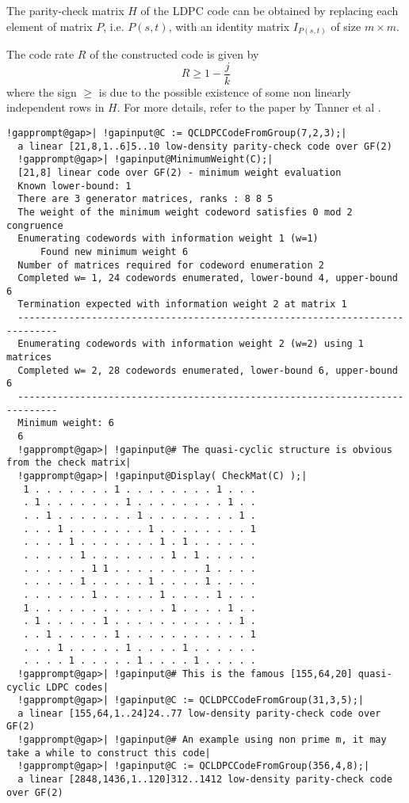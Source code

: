 \documentclass[a4paper,11pt]{report}
\begin{document}
{{{\begin{verbatim}
\end{verbatim}
 The parity-check matrix $H$ of the LDPC code can be obtained by replacing each element of matrix $P$, i.e. $P(s,t)$, with an identity matrix $I_{P(s,t)}$ of size $m \times m$. 

 The code rate $R$ of the constructed code is given by 
\[ R \geq 1 - \frac{j}{k} \]
 where the sign $\geq$ is due to the possible existence of some non linearly independent rows in $H$. For more details, refer to the paper by Tanner et al \cite{TSSFC04}. }

 
\begin{Verbatim}[commandchars=!@|,fontsize=\small,frame=single,label=Example]
  !gapprompt@gap>| !gapinput@C := QCLDPCCodeFromGroup(7,2,3);|
  a linear [21,8,1..6]5..10 low-density parity-check code over GF(2)
  !gapprompt@gap>| !gapinput@MinimumWeight(C);|
  [21,8] linear code over GF(2) - minimum weight evaluation
  Known lower-bound: 1
  There are 3 generator matrices, ranks : 8 8 5 
  The weight of the minimum weight codeword satisfies 0 mod 2 congruence
  Enumerating codewords with information weight 1 (w=1)
      Found new minimum weight 6
  Number of matrices required for codeword enumeration 2
  Completed w= 1, 24 codewords enumerated, lower-bound 4, upper-bound 6
  Termination expected with information weight 2 at matrix 1
  -----------------------------------------------------------------------------
  Enumerating codewords with information weight 2 (w=2) using 1 matrices
  Completed w= 2, 28 codewords enumerated, lower-bound 6, upper-bound 6
  -----------------------------------------------------------------------------
  Minimum weight: 6
  6
  !gapprompt@gap>| !gapinput@# The quasi-cyclic structure is obvious from the check matrix|
  !gapprompt@gap>| !gapinput@Display( CheckMat(C) );|
   1 . . . . . . . 1 . . . . . . . . 1 . . .
   . 1 . . . . . . . 1 . . . . . . . . 1 . .
   . . 1 . . . . . . . 1 . . . . . . . . 1 .
   . . . 1 . . . . . . . 1 . . . . . . . . 1
   . . . . 1 . . . . . . . 1 . 1 . . . . . .
   . . . . . 1 . . . . . . . 1 . 1 . . . . .
   . . . . . . 1 1 . . . . . . . . 1 . . . .
   . . . . . 1 . . . . . 1 . . . . 1 . . . .
   . . . . . . 1 . . . . . 1 . . . . 1 . . .
   1 . . . . . . . . . . . . 1 . . . . 1 . .
   . 1 . . . . . 1 . . . . . . . . . . . 1 .
   . . 1 . . . . . 1 . . . . . . . . . . . 1
   . . . 1 . . . . . 1 . . . . 1 . . . . . .
   . . . . 1 . . . . . 1 . . . . 1 . . . . .
  !gapprompt@gap>| !gapinput@# This is the famous [155,64,20] quasi-cyclic LDPC codes|
  !gapprompt@gap>| !gapinput@C := QCLDPCCodeFromGroup(31,3,5);|
  a linear [155,64,1..24]24..77 low-density parity-check code over GF(2)
  !gapprompt@gap>| !gapinput@# An example using non prime m, it may take a while to construct this code|
  !gapprompt@gap>| !gapinput@C := QCLDPCCodeFromGroup(356,4,8);|
  a linear [2848,1436,1..120]312..1412 low-density parity-check code over GF(2)
\end{Verbatim}
  }

 }
\end{document}
